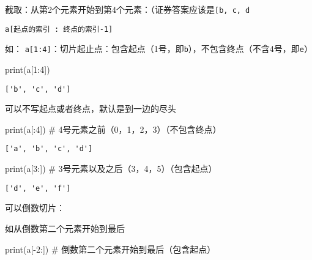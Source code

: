 \documentclass[
  letterpaper,
  DIV=11,
  numbers=noendperiod]{scrreprt}
\newenvironment{Shaded}{\begin{snugshade}}{\end{snugshade}}
\newcommand{\BuiltInTok}[1]{\textcolor[rgb]{0.00,0.23,0.31}{#1}}
\newcommand{\CommentTok}[1]{\textcolor[rgb]{0.37,0.37,0.37}{#1}}
\newcommand{\DecValTok}[1]{\textcolor[rgb]{0.68,0.00,0.00}{#1}}
\newcommand{\NormalTok}[1]{\textcolor[rgb]{0.00,0.23,0.31}{#1}}
\newcommand{\OperatorTok}[1]{\textcolor[rgb]{0.37,0.37,0.37}{#1}}
\begin{document}
截取：从第2个元素开始到第4个元素：（证券答案应该是\texttt{{[}\textquotesingle{}b\textquotesingle{},\ \textquotesingle{}c\textquotesingle{},\ \textquotesingle{}d\textquotesingle{}{]}}

\texttt{a{[}起点的索引\ :\ 终点的索引-1{]}}

如：
\texttt{a{[}1:4{]}}：切片起止点：包含起点（1号，即\texttt{b}），不包含终点（不含4号，即\texttt{e}）

\begin{Shaded}
\begin{Highlighting}[]
\BuiltInTok{print}\NormalTok{(a[}\DecValTok{1}\NormalTok{:}\DecValTok{4}\NormalTok{])}
\end{Highlighting}
\end{Shaded}

\begin{verbatim}
['b', 'c', 'd']
\end{verbatim}

可以不写起点或者终点，默认是到一边的尽头

\begin{Shaded}
\begin{Highlighting}[]
\BuiltInTok{print}\NormalTok{(a[:}\DecValTok{4}\NormalTok{]) }\CommentTok{\# 4号元素之前（0，1，2，3）（不包含终点）}
\end{Highlighting}
\end{Shaded}

\begin{verbatim}
['a', 'b', 'c', 'd']
\end{verbatim}

\begin{Shaded}
\begin{Highlighting}[]
\BuiltInTok{print}\NormalTok{(a[}\DecValTok{3}\NormalTok{:]) }\CommentTok{\# 3号元素以及之后（3，4，5）（包含起点）}
\end{Highlighting}
\end{Shaded}

\begin{verbatim}
['d', 'e', 'f']
\end{verbatim}

可以倒数切片：

如从倒数第二个元素开始到最后

\begin{Shaded}
\begin{Highlighting}[]
\BuiltInTok{print}\NormalTok{(a[}\OperatorTok{{-}}\DecValTok{2}\NormalTok{:]) }\CommentTok{\# 倒数第二个元素开始到最后（包含起点）}
\end{Highlighting}
\end{Shaded}
\end{document}
